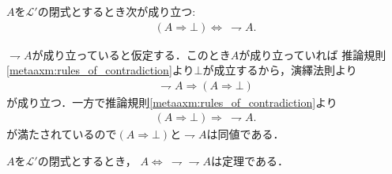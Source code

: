 	\begin{screen}
		\begin{metathm}[偽であることと否定は同値]\label{metathm:false_and_negation_are_equivalent}
			$A$を$\mathcal{L}'$の閉式とするとき次が成り立つ:
			\begin{align}
				(A \Longrightarrow \bot) \Longleftrightarrow\ \rightharpoondown A.
			\end{align}
		\end{metathm}
	\end{screen}
	
	\begin{prf}
		$\rightharpoondown A$が成り立っていると仮定する．このとき$A$が成り立っていれば
		推論規則\ref{metaaxm:rules_of_contradiction}より$\bot$が成立するから，演繹法則より
		\begin{align}
			\rightharpoondown A \Longrightarrow (A \Longrightarrow \bot)
		\end{align}
		が成り立つ．一方で推論規則\ref{metaaxm:rules_of_contradiction}より
		\begin{align}
			(A \Longrightarrow \bot) \Longrightarrow\ \rightharpoondown A.
		\end{align}
		が満たされているので$(A \Longrightarrow \bot)$と$\rightharpoondown A$は同値である．
		\QED
	\end{prf}
	
	\begin{screen}
		\begin{metathm}[二重否定の法則]
			$A$を$\mathcal{L}'$の閉式とするとき，
			$A \Longleftrightarrow\ \rightharpoondown \rightharpoondown A$は定理である．
		\end{metathm}
	\end{screen}
	
